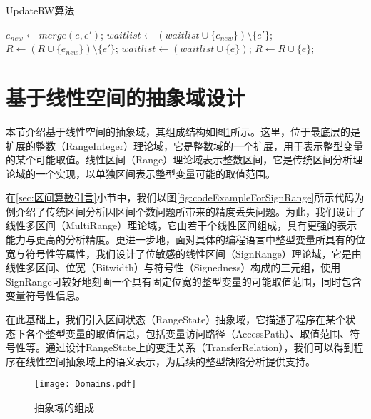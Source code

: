 \begin{breakablealgorithm}
	\caption{UpdateRW算法}
	\label{alg:UpdateRW}
	\begin{algorithmic}[1]
		
				\State $ e_{new}  \gets merge(e, e')$;
					\State $ waitlist \gets (waitlist \cup \{e_{new}\}) \setminus \{e'\} $;
					\State $ R \gets (R \cup \{e_{new}\}) \setminus \{e'\} $;
				\EndIf
			\EndFor
				\State $ waitlist \gets (waitlist \cup \{e\}) $;
				\State $ R \gets R \cup \{e\} $;
			\EndIf
		\EndFunction
		
	\end{algorithmic}
\end{breakablealgorithm}

\section{基于线性空间的抽象域设计}
\label{sec:区间算数抽象域设计}

本节介绍基于线性空间的抽象域，其组成结构如图\ref{fig:Domains}所示。这里，位于最底层的是扩展的整数（RangeInteger）理论域，它是整数域的一个扩展，用于表示整型变量的某个可能取值。线性区间（Range）理论域表示整数区间，它是传统区间分析理论域的一个实现，以单独区间表示整型变量可能的取值范围。

在\ref{sec:区间算数引言}小节中，我们以图\ref{fig:codeExampleForSignRange}所示代码为例介绍了传统区间分析因区间个数问题所带来的精度丢失问题。为此，我们设计了线性多区间（MultiRange）理论域，它由若干个线性区间组成，具有更强的表示能力与更高的分析精度。更进一步地，面对具体的编程语言中整型变量所具有的位宽与符号性等属性，我们设计了位敏感的线性区间（SignRange）理论域，它是由线性多区间、位宽（Bitwidth）与符号性（Signedness）构成的三元组，使用SignRange可较好地刻画一个具有固定位宽的整型变量的可能取值范围，同时包含变量符号性信息。

在此基础上，我们引入区间状态（RangeState）抽象域，它描述了程序在某个状态下各个整型变量的取值信息，包括变量访问路径（AccessPath）、取值范围、符号性等。通过设计RangeState上的变迁关系（TransferRelation），我们可以得到程序在线性空间抽象域上的语义表示，为后续的整型缺陷分析提供支持。

\begin{figure}[H]
	\centering
	\texttt{[image: Domains.pdf]}
	\caption{抽象域的组成}
	\label{fig:Domains}
\end{figure}

